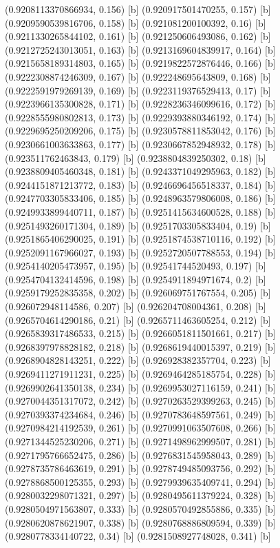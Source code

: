 {{{(0.9208113370866934, 0.156) [b] 
(0.920917501470255, 0.157) [b] 
(0.9209590539816706, 0.158) [b] 
(0.921081200100392, 0.16) [b] 
(0.9211330265844102, 0.161) [b] 
(0.921250606493086, 0.162) [b] 
(0.9212725243013051, 0.163) [b] 
(0.9213169604839917, 0.164) [b] 
(0.9215658189314803, 0.165) [b] 
(0.9219822572876446, 0.166) [b] 
(0.9222308874246309, 0.167) [b] 
(0.922248695643809, 0.168) [b] 
(0.9222591979269139, 0.169) [b] 
(0.9223119376529413, 0.17) [b] 
(0.9223966135300828, 0.171) [b] 
(0.9228236346099616, 0.172) [b] 
(0.9228555980802813, 0.173) [b] 
(0.9229393880346192, 0.174) [b] 
(0.9229695250209206, 0.175) [b] 
(0.9230578811853042, 0.176) [b] 
(0.9230661003633863, 0.177) [b] 
(0.9230667852948932, 0.178) [b] 
(0.923511762463843, 0.179) [b] 
(0.9238804839250302, 0.18) [b] 
(0.9238809405460348, 0.181) [b] 
(0.9243371049295963, 0.182) [b] 
(0.9244151871213772, 0.183) [b] 
(0.9246696456518337, 0.184) [b] 
(0.9247703305833406, 0.185) [b] 
(0.9248963579806008, 0.186) [b] 
(0.9249933899440711, 0.187) [b] 
(0.9251415634600528, 0.188) [b] 
(0.9251493260171304, 0.189) [b] 
(0.9251703305833404, 0.19) [b] 
(0.9251865406290025, 0.191) [b] 
(0.9251874538710116, 0.192) [b] 
(0.9252091167966027, 0.193) [b] 
(0.9252720507788553, 0.194) [b] 
(0.9254140205473957, 0.195) [b] 
(0.92541744520493, 0.197) [b] 
(0.9254704132414596, 0.198) [b] 
(0.9254911894971674, 0.2) [b] 
(0.9259179252835358, 0.202) [b] 
(0.926069751767554, 0.205) [b] 
(0.926072948114586, 0.207) [b] 
(0.926204708004361, 0.208) [b] 
(0.9265704614290186, 0.21) [b] 
(0.9265711463605254, 0.212) [b] 
(0.9265839317486533, 0.215) [b] 
(0.9266051811501661, 0.217) [b] 
(0.9268397978828182, 0.218) [b] 
(0.9268619440015397, 0.219) [b] 
(0.9268904828143251, 0.222) [b] 
(0.926928382357704, 0.223) [b] 
(0.9269411271911231, 0.225) [b] 
(0.9269464285185754, 0.228) [b] 
(0.9269902641350138, 0.234) [b] 
(0.9269953027116159, 0.241) [b] 
(0.9270044351317072, 0.242) [b] 
(0.9270263529399263, 0.245) [b] 
(0.9270393374234684, 0.246) [b] 
(0.9270783648597561, 0.249) [b] 
(0.9270984214192539, 0.261) [b] 
(0.9270991063507608, 0.266) [b] 
(0.9271344525230206, 0.271) [b] 
(0.9271498962999507, 0.281) [b] 
(0.9271795766652475, 0.286) [b] 
(0.9276831545958043, 0.289) [b] 
(0.9278735786463619, 0.291) [b] 
(0.9278749485093756, 0.292) [b] 
(0.9278868500125355, 0.293) [b] 
(0.9279939635409741, 0.294) [b] 
(0.9280032298071321, 0.297) [b] 
(0.9280495611379224, 0.328) [b] 
(0.9280504971563807, 0.333) [b] 
(0.9280570492855886, 0.335) [b] 
(0.9280620878621907, 0.338) [b] 
(0.9280768886809594, 0.339) [b] 
(0.9280778334140722, 0.34) [b] 
(0.9281508927748028, 0.341) [b] 
}}}
